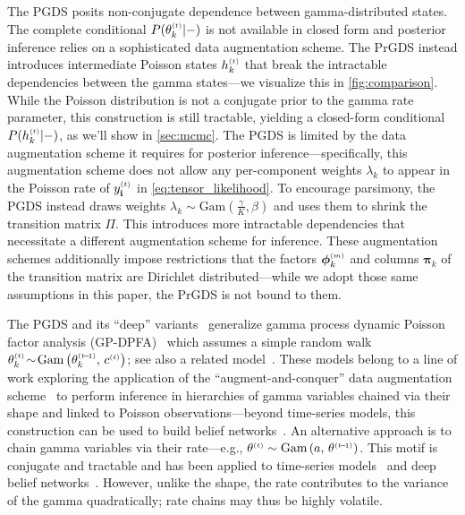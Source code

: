 \documentclass{article}
\begin{document}
The PGDS posits non-conjugate dependence between gamma-distributed states. The complete conditional $P(\thetakt | -)$ is not available in closed form and posterior inference relies on a sophisticated data augmentation scheme. The PrGDS instead introduces intermediate Poisson states $\hkt$ that break the intractable dependencies between the gamma states---we visualize this in \cref{fig:comparison}. While the Poisson distribution is not a conjugate prior to the gamma rate parameter, this construction is still tractable, yielding a closed-form conditional $P(\hkt | -)$, as we'll show in \cref{sec:mcmc}. The PGDS is limited by the data augmentation scheme it requires for posterior inference---specifically, this augmentation scheme does not allow any per-component weights $\lambda_k$ to appear in the Poisson rate of $\ydt$ in \cref{eq:tensor_likelihood}. To encourage parsimony, the PGDS instead draws weights $\lambda_k \sim \textrm{Gam}(\tfrac{\gamma}{K}, \beta)$ and uses them to shrink the transition matrix $\Pi$. This introduces more intractable dependencies that necessitate a different augmentation scheme for inference. These augmentation schemes additionally impose restrictions that the factors $\boldsymbol{\phi}_k^{\mathsmaller{(m)}}$ and columns $\boldsymbol{\pi}_k$ of the transition matrix are Dirichlet distributed---while we adopt those same assumptions in this paper, the PrGDS is not bound to them.~

The PGDS and its ``deep'' variants~\cite{gong2017deep,guo2018deep} generalize gamma process dynamic Poisson factor analysis (GP-DPFA)~\citep{acharya2015nonparametric} which assumes a simple random walk $\thetakt \tsim \Gam{\theta^{\mathsmaller{(t \tm 1)}}_k,\, c^{\mathsmaller{(t)}}}$; see also a related model~\cite{yang2018dependent}. These models belong to a line of work exploring the application of the ``augment-and-conquer'' data augmentation scheme~\cite{zhou2012augment-and-conquer} to perform inference in hierarchies of gamma variables chained via their shape and linked to Poisson observations---beyond time-series models, this construction can be used to build belief networks~\cite{zhou2015poisson}. An alternative approach is to chain gamma variables via their rate---e.g., $\theta^{\mathsmaller{(t)}} \sim \Gam{a,\,\theta^{\mathsmaller{(t\tm 1)}}}$. This motif is conjugate and tractable and has been applied to time-series models~\cite{cemgil2007conjugate,fevotte2013non,jerfel2016dynamic} and deep belief networks~\cite{ranganath2015deep}. However, unlike the shape, the rate contributes to the variance of the gamma quadratically; rate chains may thus be highly volatile.~
\end{document}
